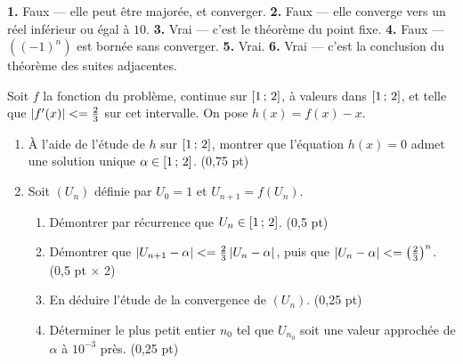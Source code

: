 \begin{corrige}[je me teste]
\textbf{1.} Faux — elle peut être majorée, et converger.
\textbf{2.} Faux — elle converge vers un réel inférieur ou égal à $10$.
\textbf{3.} Vrai — c'est le théorème du point fixe.
\textbf{4.} Faux — $\left((-1)^{n}\right)$ est bornée sans converger.
\textbf{5.} Vrai.
\textbf{6.} Vrai — c'est la conclusion du théorème des suites adjacentes.
\end{corrige}

\begin{commeaubac}
Soit $f$ la fonction du problème, continue sur $\left[1\,;\,2\right]$, à valeurs
dans $\left[1\,;\,2\right]$, et telle que $\left|f'(x)\right| <= \frac23$ sur cet
intervalle. On pose $h(x) = f(x)-x$.

\begin{enumerate}[label=\textbf{\arabic*.}, leftmargin=*, itemsep=0.25em]
  \item À l'aide de l'étude de $h$ sur $\left[1\,;\,2\right]$, montrer que
        l'équation $h(x) = 0$ admet une solution unique
        $\alpha \in \left[1\,;\,2\right]$. \hfill\textup{(0,75 pt)}
  \item Soit $(U_{n})$ définie par $U_{0} = 1$ et $U_{n+1} = f(U_{n})$.
        \begin{enumerate}[label=\textbf{\alph*)}, leftmargin=1.4em]
          \item Démontrer par récurrence que $U_{n} \in \left[1\,;\,2\right]$.
                \hfill\textup{(0,5 pt)}
          \item Démontrer que
                $\left|U_{n+1}-\alpha\right| <= \frac23\left|U_{n}-\alpha\right|$, puis
                que $\left|U_{n}-\alpha\right| <= \left(\frac23\right)^{n}$.
                \hfill\textup{(0,5 pt $\times$ 2)}
          \item En déduire l'étude de la convergence de $(U_{n})$.
                \hfill\textup{(0,25 pt)}
          \item Déterminer le plus petit entier $n_{0}$ tel que $U_{n_{0}}$
                soit une valeur approchée de $\alpha$ à $10^{-3}$ près.
                \hfill\textup{(0,25 pt)}
        \end{enumerate}
\end{enumerate}
\end{commeaubac}

